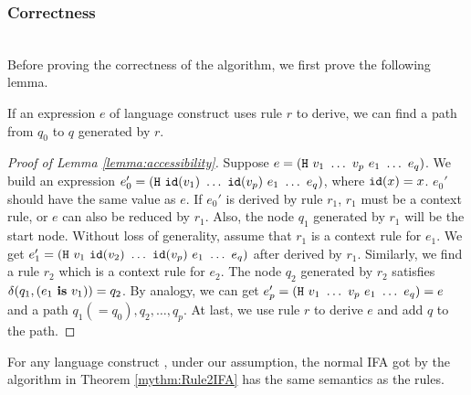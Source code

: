 \subsubsection{Correctness}
~\\

Before proving the correctness of the algorithm, we first prove the following lemma.

\begin{lemma}
    \label{lemma:accessibility}
    If an expression $e$ of language construct  uses rule $r$ to derive, we can find a path from $q_0$ to $q$ generated by $r$.
\end{lemma}

\begin{proof}[Proof of Lemma \ref{lemma:accessibility}]
    Suppose $e=(\mbox{\tt H}~v_1~\ldots~v_p~e_1~\ldots~e_q)$. We build an expression $e_0'=(\mbox{\tt H}~\mbox{\tt id}(v_1)~\ldots~\mbox{\tt id}(v_p)~e_1~\ldots~e_q)$, where $\mbox{\tt id}(x)=x$. $e_0'$ should have the same value as $e$. If $e_0'$ is derived by rule $r_1$, $r_1$ must be a context rule, or $e$ can also be reduced by $r_1$. Also, the node $q_1$ generated by $r_1$ will be the start node. Without loss of generality, assume that $r_1$ is a context rule for $e_1$. We get $e_1'=(\mbox{\tt H}~v_1~\mbox{\tt id}(v_2)~\ldots~\mbox{\tt id}(v_p)~e_1~\ldots~e_q)$ after derived by $r_1$. Similarly, we find a rule $r_2$ which is a context rule for $e_2$. The node $q_2$ generated by $r_2$ satisfies $\delta(q_1, (e_1~\mbox{\rm \bf is}~v_1))=q_2$. By analogy, we can get $e_p'=(\mbox{\tt H}~v_1~\ldots~v_p~e_1~\ldots~e_q)=e$ and a path $q_1(=q_0), q_2, \ldots, q_p$. At last, we use rule $r$ to derive $e$ and add $q$ to the path.
\end{proof}

\begin{lemma}[Correctness]
    \label{lemma:rule2ifa-correct}
    For any language construct , under our assumption, the normal IFA got by the algorithm in Theorem \ref{mythm:Rule2IFA} has the same semantics as the rules.
\end{lemma}


